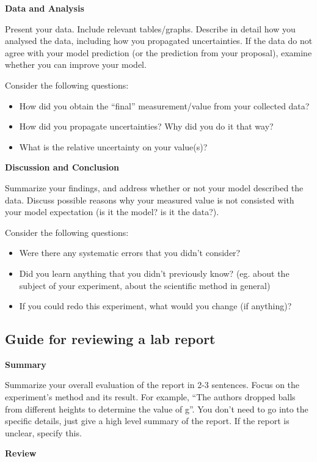 \textbf{Data and Analysis}

Present your data. Include relevant tables/graphs. Describe in detail how you analysed the data, including how you propagated uncertainties. If the data do not agree with your model prediction (or the prediction from your proposal), examine whether you can improve your model. 

Consider the following questions:
\begin{itemize}
\item How did you obtain the ``final'' measurement/value from your collected data? 
\item How did you propagate uncertainties? Why did you do it that way?
\item What is the relative uncertainty on your value(s)?
\end{itemize}

\textbf{Discussion and Conclusion}

Summarize your findings, and address whether or not your model described the data. Discuss possible reasons why your measured value is not consisted with your model expectation (is it the model? is it the data?).

Consider the following questions:
\begin{itemize}
\item Were there any systematic errors that you didn't consider?
\item Did you learn anything that you didn't previously know? (eg. about the subject of your experiment, about the scientific method in general)
\item If you could redo this experiment, what would you change (if anything)?
\end{itemize}

\newpage
\subsection{Guide for reviewing a lab report}
 \vspace{0.25cm}
\textbf{Summary}

Summarize your overall evaluation of the report in 2-3 sentences. Focus on the experiment's method and its result. For example, ``The authors dropped balls from different heights to determine the value of g''. You don't need to go into the specific details, just give a high level summary of the report. If the report is unclear, specify this.

\textbf{Review}

